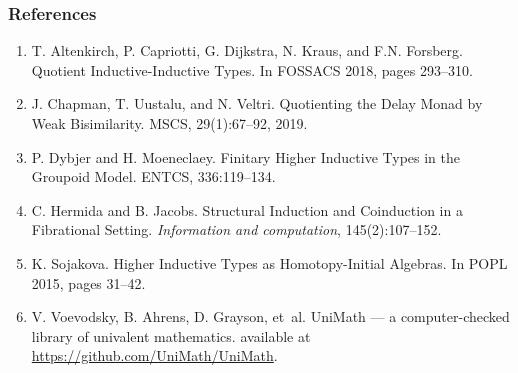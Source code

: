 \documentclass{beamer}
\newcommand{\remove}[1]{}
\newcommand{\ep}[3]{\mathcal{E}_{#1}(#2,#3)} %
\newcommand{\id}[1]{\constructor{id}_{#1}} %
\newcommand{\comp}[2]{#1 \cdot #2} %
\newcommand{\inle}{\constructor{inl}} %
\newcommand{\inre}{\constructor{inr}} %
\newcommand{\prle}{\constructor{pr}_1} %
\newcommand{\prre}{\constructor{pr}_2} %
\newcommand{\pair}[2]{(#1 , #2)} %
\newcommand{\Ce}{\constructor{c}} %
\newcommand{\constr}{\constructor{constr}} %
\newcommand{\poly}{\mathcal{P}} %
\newcommand{\C}{\constructor{C}} %
\newcommand{\I}{\constructor{I}} %
\newcommand{\sumP}[2]{#1 + #2} %
\newcommand{\prodP}[2]{#1 \times #2} %
\newcommand{\hset}{\type{hSet}} %
\begin{document}
\begin{frame}
\frametitle{References}
\begin{enumerate}
	\item T. Altenkirch, P. Capriotti, G. Dijkstra, N. Kraus, and
	F.N. Forsberg.
	Quotient Inductive-Inductive Types.
	In FOSSACS 2018, pages 293--310.
	\item J. Chapman, T. Uustalu, and N. Veltri.
	Quotienting the Delay Monad by Weak Bisimilarity.
	MSCS, 29(1):67--92,
	2019.
	\item P. Dybjer and H. Moeneclaey.
	Finitary Higher Inductive Types in the Groupoid Model.
	ENTCS, 336:119--134.
	\item C. Hermida and B. Jacobs.
	Structural Induction and Coinduction in a Fibrational Setting.
	{\em Information and computation}, 145(2):107--152.
	\item K. Sojakova.
	Higher Inductive Types as Homotopy-Initial Algebras.
	In POPL 2015, pages 31--42.
	\item V. Voevodsky, B. Ahrens, D. Grayson, et~al.
	UniMath --- a computer-checked library of univalent mathematics.
	available at \url{https://github.com/UniMath/UniMath}.
\end{enumerate}
\end{frame}

\remove{
\frametitle{Extra Slide: All Endpoints}
\begin{prooftree}
	\AxiomC{$P : \poly$}
	\UnaryInfC{$\id{A} : \ep{A}{P}{P}$}
\end{prooftree}
\begin{bprooftree}
	\AxiomC{$P, Q, R : \poly$}
	\AxiomC{$e_1 : \ep{A}{P}{Q}$}
	\AxiomC{$e_2 : \ep{A}{Q}{R}$}
	\TrinaryInfC{$\comp{e_1}{e_2} : \ep{A}{P}{R}$}
\end{bprooftree}
\begin{bprooftree}
	\AxiomC{$P, Q : \poly$}
	\UnaryInfC{$\inle : \ep{A}{P}{\sumP{P}{Q}}$}
\end{bprooftree}
\begin{bprooftree}
	\AxiomC{$P, Q : \poly$}
	\UnaryInfC{$\inre : \ep{A}{Q}{\sumP{P}{Q}}$}
\end{bprooftree}
\begin{bprooftree}
	\AxiomC{$P, Q : \poly$}
	\UnaryInfC{$\prle : \ep{A}{\prodP{P}{Q}}{P}$}
\end{bprooftree}
\begin{bprooftree}
	\AxiomC{$P, Q : \poly$}
	\UnaryInfC{$\prre : \ep{A}{\prodP{P}{Q}}{Q}$}
\end{bprooftree}
\begin{bprooftree}
	\AxiomC{$\constr : \ep{A}{A}{\I}$}
\end{bprooftree}
\begin{bprooftree}
	\AxiomC{$P : \poly$}
	\AxiomC{$X : \hset$}
	\AxiomC{$x : X$}
	\TrinaryInfC{$\Ce \> x : \ep{A}{P}{\C \> X}$}
\end{bprooftree}
\begin{bprooftree}
	\AxiomC{$P, Q, R: \poly$}
	\AxiomC{$e_1 : \ep{A}{P}{Q}$}
	\AxiomC{$e_2 : \ep{A}{P}{R}$}
	\TrinaryInfC{$\pair{e_1}{e_2} : \ep{A}{P}{\prodP{Q}{R}}$}
\end{bprooftree}
}
\end{document}

